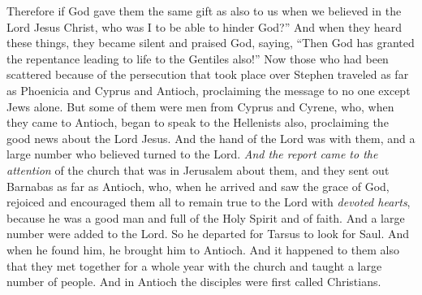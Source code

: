 \begin{biblechapter}
\verse Therefore if God gave them the same gift as also to us when we believed in the Lord Jesus Christ, who was I to be able to hinder God?”
\verse And when they heard these things, they became silent and praised God, saying, “Then God has granted the repentance leading to life to the Gentiles also!”
 Now those who had been scattered because of the persecution that took place over Stephen traveled as far as Phoenicia and Cyprus and Antioch, proclaiming the message to no one except Jews alone.
\verse But some of them were men from Cyprus and Cyrene, who, when they came to Antioch, began to speak to the Hellenists also, proclaiming the good news about the Lord Jesus.
\verse And the hand of the Lord was with them, and a large number who believed turned to the Lord.
\verse \textit{And the report came to the attention} of the church that was in Jerusalem about them, and they sent out Barnabas as far as Antioch,
\verse who, when he arrived and saw the grace of God, rejoiced and encouraged them all to remain true to the Lord with \textit{devoted hearts},
\verse because he was a good man and full of the Holy Spirit and of faith. And a large number were added to the Lord.
\verse So he departed for Tarsus to look for Saul.
\verse And when he found him, he brought him to Antioch. And it happened to them also that they met together for a whole year with the church and taught a large number of people. And in Antioch the disciples were first called Christians.

\end{biblechapter}
